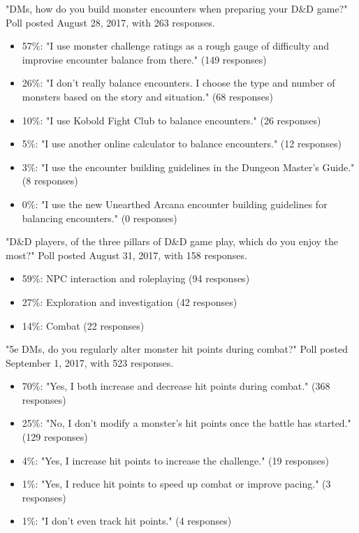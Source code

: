 \documentclass[10pt,a4paper,twoside,bg=print,twocolumn,openany,nodeprecatedcode]{dndbook}
\begin{document}
"DMs, how do you build monster encounters when preparing your D\&D game?"
Poll posted August 28, 2017, with 263 responses.

\begin{itemize}
\item 57\%: "I use monster challenge ratings as a rough gauge of difficulty and improvise encounter balance from there." (149 responses)
\item 26\%: "I don't really balance encounters. I choose the type and number of monsters based on the story and situation." (68 responses)
\item 10\%: "I use Kobold Fight Club to balance encounters." (26 responses)
\item 5\%: "I use another online calculator to balance encounters." (12 responses)
\item 3\%: "I use the encounter building guidelines in the Dungeon Master's Guide." (8 responses)
\item 0\%: "I use the new Unearthed Arcana encounter building guidelines for balancing encounters." (0 responses)
\end{itemize}

"D\&D players, of the three pillars of D\&D game play, which do you enjoy the most?"
Poll posted August 31, 2017, with 158 responses.

\begin{itemize}
\item 59\%: NPC interaction and roleplaying (94 responses)
\item 27\%: Exploration and investigation (42 responses)
\item 14\%: Combat (22 responses)
\end{itemize}

"5e DMs, do you regularly alter monster hit points during combat?"
Poll posted September 1, 2017, with 523 responses.

\begin{itemize}
\item 70\%: "Yes, I both increase and decrease hit points during combat." (368 responses)
\item 25\%: "No, I don't modify a monster's hit points once the battle has started." (129 responses)
\item 4\%: "Yes, I increase hit points to increase the challenge." (19 responses)
\item 1\%: "Yes, I reduce hit points to speed up combat or improve pacing." (3 responses)
\item 1\%: "I don't even track hit points." (4 responses)
\end{itemize}
\end{document}
